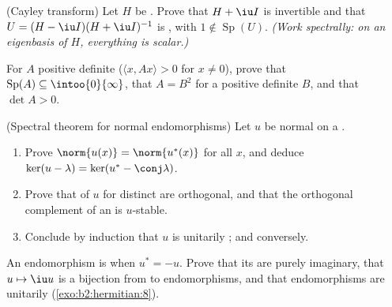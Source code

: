 \begin{exercise}[$\star\star$]\label{exo:b2:hermitian:6}
(Cayley transform) Let $H$ be . Prove that $H + \iu I$ is
invertible and that $U = (H - \iu I)(H + \iu I)^{-1}$ is ,
with $1 \notin \operatorname{Sp}(U)$. \emph{(Work spectrally: on an
eigenbasis of $H$, everything is scalar.)}
\end{exercise}

\begin{exercise}[$\star\star$]\label{exo:b2:hermitian:7}
For $A$  positive definite ($\langle x, Ax\rangle > 0$ for
$x \neq 0$), prove that $\operatorname{Sp}(A) \subseteq
\intoo{0}{\infty}$, that $A = B^2$ for a  positive
definite $B$, and that $\det A > 0$.
\end{exercise}

\begin{exercise}[$\star\star\star$]\label{exo:b2:hermitian:8}
(Spectral theorem for normal endomorphisms) Let $u$ be normal on a
.
\begin{enumerate}
  \item Prove $\norm{u(x)} = \norm{u^*(x)}$ for all $x$, and deduce
        $\ker(u - \lambda) = \ker(u^* - \conj\lambda)$.
  \item Prove that  of $u$ for distinct  are
        orthogonal, and that the orthogonal complement of an
         is $u$-stable.
  \item Conclude by induction that $u$ is unitarily ;
        and conversely.
\end{enumerate}
\end{exercise}

\begin{exercise}[$\star$]\label{exo:b2:hermitian:9}
An endomorphism is \emph{} when $u^* = -u$. Prove
that its  are purely imaginary, that $u \mapsto \iu
u$ is a bijection from  to 
endomorphisms, and that  endomorphisms are
unitarily  (\cref{exo:b2:hermitian:8}).
\end{exercise}

